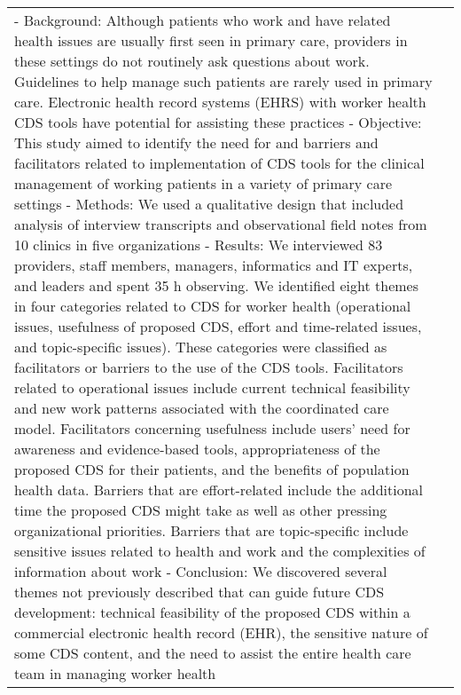 {\begin{landscape}
\begin{longtable}{p{3cm}p{}}
    - Background: Although patients who work and have related health issues are usually first seen in primary care, providers in these settings do not routinely ask questions about work.
    Guidelines to help manage such patients are rarely used in primary care.
    Electronic health record systems (EHRS) with worker health CDS tools have potential for assisting these practices
    - Objective: This study aimed to identify the need for and barriers and facilitators related to implementation of CDS tools for the clinical management of working patients in a variety of primary care settings
    - Methods: We used a qualitative design that included analysis of interview transcripts and observational field notes from 10 clinics in five organizations
    - Results: We interviewed 83 providers, staff members, managers, informatics and IT experts, and leaders and spent 35 h observing.
    We identified eight themes in four categories related to CDS for worker health (operational issues, usefulness of proposed CDS, effort and time-related issues, and topic-specific issues). These categories were classified as facilitators or barriers to the use of the CDS tools.
    Facilitators related to operational issues include current technical feasibility and new work patterns associated with the coordinated care model.
    Facilitators concerning usefulness include users' need for awareness and evidence-based tools, appropriateness of the proposed CDS for their patients, and the benefits of population health data.
    Barriers that are effort-related include the additional time the proposed CDS might take as well as other pressing organizational priorities.
    Barriers that are topic-specific include sensitive issues related to health and work and the complexities of information about work
    - Conclusion: We discovered several themes not previously described that can guide future CDS development: technical feasibility of the proposed CDS within a commercial electronic health record (EHR), the sensitive nature of some CDS content, and the need to assist the entire health care team in managing worker health


\end{longtable}
\end{landscape}}
